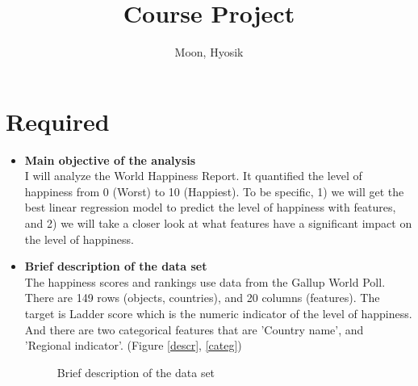 \documentclass[12pt]{article}
\title{Course Project}
\author{
  Moon, Hyosik
  }
\begin{document}
\maketitle

\section{Required}

\begin{itemize}
\item \textbf{Main objective of the analysis} \\
I will analyze the World Happiness Report. 
It quantified the level of happiness from 0 (Worst) to 10 (Happiest). To be specific, 1) we will get the best linear regression model to predict the level of happiness with features, and 2) we will take a closer look at what features have a significant impact on the level of happiness.

\item \textbf{Brief description of the data set} \\
The happiness scores and rankings use data from the Gallup World Poll. There are 149 rows (objects, countries), and 20 columns (features). The target is Ladder score which is the numeric indicator of the level of happiness. And there are two categorical features that are 'Country name', and 'Regional indicator'. (Figure \ref{descr}, \ref{categ})



\begin{figure}[hbt!]
    \centering
    \hfill
    \caption{Brief description of the data set}
\end{figure}


\end{itemize}
\end{document}
